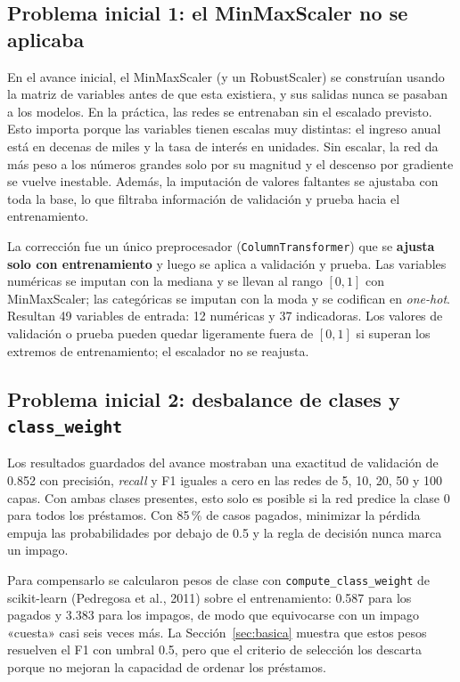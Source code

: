 \documentclass[12pt,a4paper]{article}
\newcommand{\code}[1]{\texttt{#1}}
\begin{document}
\subsection{Problema inicial 1: el MinMaxScaler no se aplicaba}

En el avance inicial, el MinMaxScaler (y un RobustScaler) se construían usando la matriz de variables antes de que esta existiera, y sus salidas nunca se pasaban a los modelos. En la práctica, las redes se entrenaban sin el escalado previsto. Esto importa porque las variables tienen escalas muy distintas: el ingreso anual está en decenas de miles y la tasa de interés en unidades. Sin escalar, la red da más peso a los números grandes solo por su magnitud y el descenso por gradiente se vuelve inestable. Además, la imputación de valores faltantes se ajustaba con toda la base, lo que filtraba información de validación y prueba hacia el entrenamiento.

La corrección fue un único preprocesador (\code{ColumnTransformer}) que se \textbf{ajusta solo con entrenamiento} y luego se aplica a validación y prueba. Las variables numéricas se imputan con la mediana y se llevan al rango $[0,1]$ con MinMaxScaler; las categóricas se imputan con la moda y se codifican en \textit{one-hot}. Resultan 49 variables de entrada: 12 numéricas y 37 indicadoras. Los valores de validación o prueba pueden quedar ligeramente fuera de $[0,1]$ si superan los extremos de entrenamiento; el escalador no se reajusta.

\subsection{Problema inicial 2: desbalance de clases y \texttt{class\_weight}}\label{sec:classweight}

Los resultados guardados del avance mostraban una exactitud de validación de 0.852 con precisión, \textit{recall} y F1 iguales a cero en las redes de 5, 10, 20, 50 y 100 capas. Con ambas clases presentes, esto solo es posible si la red predice la clase 0 para todos los préstamos. Con 85\,\% de casos pagados, minimizar la pérdida empuja las probabilidades por debajo de 0.5 y la regla de decisión nunca marca un impago.

Para compensarlo se calcularon pesos de clase con \code{compute\_class\_weight} de scikit-learn (Pedregosa et al., 2011) sobre el entrenamiento: 0.587 para los pagados y 3.383 para los impagos, de modo que equivocarse con un impago «cuesta» casi seis veces más. La Sección~\ref{sec:basica} muestra que estos pesos resuelven el F1 con umbral 0.5, pero que el criterio de selección los descarta porque no mejoran la capacidad de ordenar los préstamos.
\end{document}
